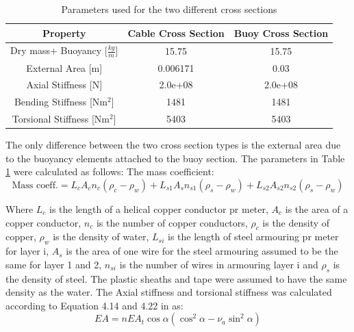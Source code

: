 \begin{table} [H]
\centering
\begin{tabular}{ |c|c|c|}
\hline
Property& Cable Cross Section & Buoy Cross Section \\
 \hline
 \hline
Dry mass+ Buoyancy [$\frac{kg}{m}$] & 15.75 & 15.75\\
External Area [m]& 0.006171 & 0.03\\
Axial Stiffness [N] & 2.0e+08 & 2.0e+08\\
Bending Stiffness [Nm$^2$] & 1481 & 1481\\
Torsional Stiffness [Nm$^2$] & 5403 & 5403\\
 \hline
\end{tabular}
\caption{Parameters used for the two different cross sections}
\label{table:crosssima}
\end{table}
\noindent The only difference between the two cross section types is the external area due to the buoyancy elements attached to the buoy section. The parameters in Table \ref{table:crosssima} were calculated as follows:\newline
\newline 
\noindent The mass coefficient: 
\begin{equation}
\text{Mass coeff.}=L_{c} A_cn_c (\rho_c-\rho_w) + L_{s1} A_{s}n_{s1} (\rho_s-\rho_w)+L_{s2} A_{s2}n_{s2} (\rho_s-\rho_w)
\end{equation}

\noindent Where $L_c$ is the length of a helical copper conductor pr meter, $A_c$ is the area of a copper conductor, $n_c$ is the number of copper conductors, $\rho_c$ is the density of copper, $\rho_w$ is the density of water, $L_{si}$ is the length of steel armouring pr meter for layer i, $A_s$ is the area of one wire for the steel armouring assumed to be the same for layer 1 and 2, $n_{si}$ is the number of wires in armouring layer i and $\rho_s$ is the density of steel. The plastic sheaths and tape were assumed to have the same density as the water. \newline
\newline 
The Axial stiffness and torsional stiffness was calculated according to Equation 4.14 and 4.22 in \cite{Savik2016} as:
\begin{equation}
    EA=nEA_t \cos\alpha(\cos^2\alpha-\nu_a \sin^2\alpha)
\end{equation}

